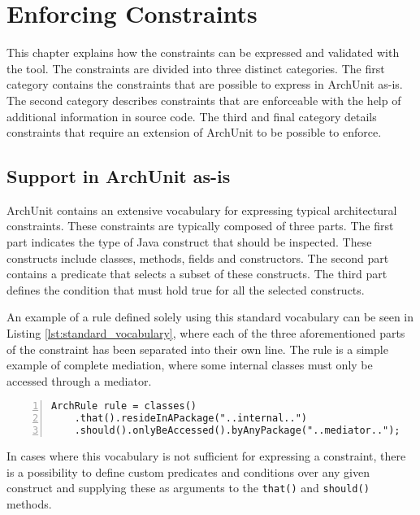 \chapter{Enforcing Constraints}

This chapter explains how the constraints can be expressed and validated with the tool. The constraints are divided into three distinct categories. The first category contains the constraints that are possible to express in ArchUnit as-is. The second category describes constraints that are enforceable with the help of additional information in source code. The third and final category details constraints that require an extension of ArchUnit to be possible to enforce.

\section{Support in ArchUnit as-is}

ArchUnit contains an extensive vocabulary for expressing typical architectural constraints. These constraints are typically composed of three parts. The first part indicates the type of Java construct that should be inspected. These constructs include classes, methods, fields and constructors. The second part contains a predicate that selects a subset of these constructs. The third part defines the condition that must hold true for all the selected constructs.

An example of a rule defined solely using this standard vocabulary can be seen in Listing \ref{lst:standard_vocabulary}, where each of the three aforementioned parts of the constraint has been separated into their own line. The rule is a simple example of complete mediation, where some internal classes must only be accessed through a mediator.

\begin{lstlisting}[caption={Example of a rule that is expressed with the standard vocabulary.}, captionpos=b, label=lst:standard_vocabulary, numbers=left]
ArchRule rule = classes()
    .that().resideInAPackage("..internal..")
    .should().onlyBeAccessed().byAnyPackage("..mediator..");
\end{lstlisting}

In cases where this vocabulary is not sufficient for expressing a constraint, there is a possibility to define custom predicates and conditions over any given construct and supplying these as arguments to the \texttt{that()} and \texttt{should()} methods.

